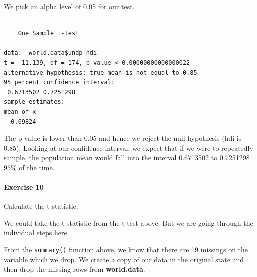 \documentclass[]{article}
\newenvironment{Shaded}{\begin{snugshade}}{\end{snugshade}}
\newcommand{\KeywordTok}[1]{\textcolor[rgb]{0.13,0.29,0.53}{\textbf{#1}}}
\newcommand{\DataTypeTok}[1]{\textcolor[rgb]{0.13,0.29,0.53}{#1}}
\newcommand{\FloatTok}[1]{\textcolor[rgb]{0.00,0.00,0.81}{#1}}
\newcommand{\StringTok}[1]{\textcolor[rgb]{0.31,0.60,0.02}{#1}}
\newcommand{\CommentTok}[1]{\textcolor[rgb]{0.56,0.35,0.01}{\textit{#1}}}
\newcommand{\OperatorTok}[1]{\textcolor[rgb]{0.81,0.36,0.00}{\textbf{#1}}}
\newcommand{\NormalTok}[1]{#1}
\let\oldparagraph\paragraph
\renewcommand{\paragraph}[1]{\oldparagraph{#1}\mbox{}}
\theoremstyle{definition}
\theoremstyle{definition}
\theoremstyle{definition}
\theoremstyle{remark}
\begin{document}
We pick an alpha level of 0.05 for our test.

\begin{Shaded}
\end{Shaded}

\begin{verbatim}

    One Sample t-test

data:  world.data$undp_hdi
t = -11.139, df = 174, p-value < 0.00000000000000022
alternative hypothesis: true mean is not equal to 0.85
95 percent confidence interval:
 0.6713502 0.7251298
sample estimates:
mean of x 
  0.69824 
\end{verbatim}

The p-value is lower than 0.05 and hence we reject the null hypothesis
(hdi is 0.85). Looking at our confidence interval, we expect that if we
were to repeatedly sample, the population mean would fall into the
interval 0.6713502 to 0.7251298 \(95\%\) of the time.

\paragraph{Exercise 10}\label{exercise-10-2}

Calculate the t statistic.

We could take the t statistic from the t test above. But we are going
through the individual steps here.

From the \texttt{summary()} function above, we know that there are 19
missings on the variable which we drop. We create a copy of our data in
the original state and then drop the missing rows from
\textbf{world.data}.

\begin{Shaded}
\end{Shaded}
\end{document}

